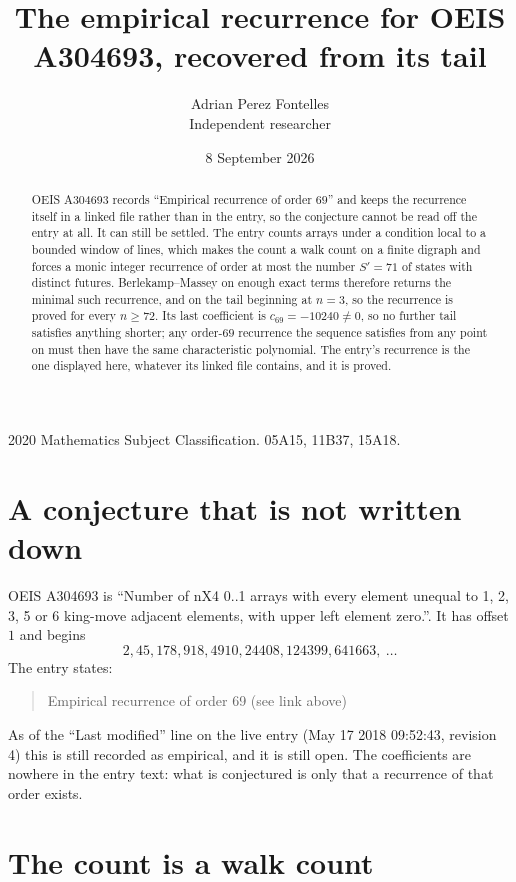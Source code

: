 \documentclass[11pt,a4paper]{article}
\title{The empirical recurrence for OEIS A304693, recovered from its tail}
\author{Adrian Perez Fontelles\\ \small Independent researcher}
\date{8 September 2026}
\theoremstyle{plain}
\theoremstyle{definition}
\begin{document}
\maketitle

\begin{abstract}
OEIS A304693 records ``Empirical recurrence of order $69$'' and keeps the recurrence itself in
a linked file rather than in the entry, so the conjecture cannot be read off the entry at all.
It can still be settled. The entry counts arrays under a condition local to a bounded window of
lines, which makes the count a walk count on a finite digraph and forces a monic integer
recurrence of order at most the number $S'=71$ of states with distinct futures. Berlekamp--Massey on
enough exact terms therefore returns the minimal such recurrence, and on the tail beginning at $n=3$, so the recurrence is proved for every $n\ge72$.
Its last coefficient is $c_{69}=-10240\neq0$, so no further tail satisfies anything
shorter; any order-$69$ recurrence the sequence satisfies from any point on must then have
the same characteristic polynomial. The entry's recurrence is the one displayed here, whatever
its linked file contains, and it is proved.
\end{abstract}

\noindent\small 2020 Mathematics Subject Classification. 05A15, 11B37, 15A18.\normalsize

\section{A conjecture that is not written down}

OEIS A304693 is ``Number of nX4 0..1 arrays with every element unequal to 1, 2, 3, 5 or 6 king-move adjacent elements, with upper left element zero.''. It has offset $1$ and begins
\[
2, 45, 178, 918, 4910, 24408, 124399, 641663,\ \dots
\]
The entry states:
\begin{quote}
Empirical recurrence of order 69 (see link above)
\end{quote}
As of the ``Last modified'' line on the live entry (May 17 2018 09:52:43, revision 4)
this is still recorded as empirical, and it is still open. The coefficients are nowhere in the
entry text: what is conjectured is only that a recurrence of that order exists.

\section{The count is a walk count}
\end{document}
